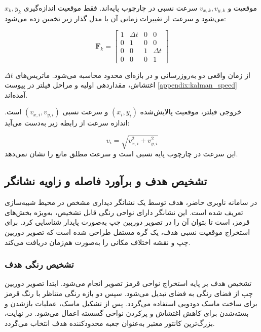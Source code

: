 \(x_k,y_k\) موقعیت و \(v_{x,k},v_{y,k}\) سرعت نسبی در چارچوب پایه‌اند. فقط موقعیت اندازه‌گیری می‌شود و سرعت از تغییرات زمانی آن با مدل گذار زیر تخمین زده می‌شود:

\begin{equation}
	\mathbf{F}_k =
	\begin{bmatrix}
		1 & \Delta t & 0 & 0 \\
		0 & 1        & 0 & 0 \\
		0 & 0        & 1 & \Delta t \\
		0 & 0        & 0 & 1
	\end{bmatrix}
	\label{eq:kalman_transition_obstacle}
\end{equation}

\(\Delta t\) از زمان واقعی دو به‌روزرسانی و در بازه‌ای محدود محاسبه می‌شود. ماتریس‌های اغتشاش، مقداردهی اولیه و مراحل فیلتر در پیوست \ref{appendix:kalman_speed} آمده‌اند.

خروجی فیلتر، موقعیت پالایش‌شده \((x_i,y_i)\) و سرعت نسبی \((v_{x,i},v_{y,i})\) است. اندازه سرعت از رابطه زیر به‌دست می‌آید:

\begin{equation}
	v_i =
	\sqrt{
		v_{x,i}^{2}
		+
		v_{y,i}^{2}
	}
	\label{eq:obstacle_speed}
\end{equation}
این سرعت در چارچوب پایه نسبی است و سرعت مطلق مانع را نشان نمی‌دهد.
\subsection{تشخیص هدف و برآورد فاصله و زاویه نشانگر}
\label{subsec:goal_marker_detection}

در سامانه ناوبری حاضر، هدف توسط یک نشانگر دیداری مشخص در محیط شبیه‌سازی تعریف شده است. این نشانگر دارای نواحی رنگی قابل تشخیص، به‌ویژه بخش‌های قرمز، است تا بتوان آن را در تصویر دوربین چپ به‌صورت پایدار شناسایی کرد. برای استخراج موقعیت نسبی هدف، یک گره مستقل طراحی شده است که تصویر دوربین چپ و نقشه اختلاف مکانی را به‌صورت هم‌زمان دریافت می‌کند.

\subsubsection{تشخیص رنگی هدف}

تشخیص هدف بر پایه استخراج نواحی قرمز تصویر انجام می‌شود. ابتدا تصویر دوربین چپ از فضای رنگی  به فضای  تبدیل می‌شود. سپس دو بازه رنگی متناظر با رنگ قرمز برای ساخت ماسک دودویی استفاده می‌گردد. پس از تشکیل ماسک، عملیات بازشدن و بسته‌شدن برای کاهش اغتشاش و پرکردن نواحی گسسته اعمال می‌شود. در نهایت، بزرگ‌ترین کانتور معتبر به‌عنوان جعبه محدودکننده هدف انتخاب می‌گردد.

